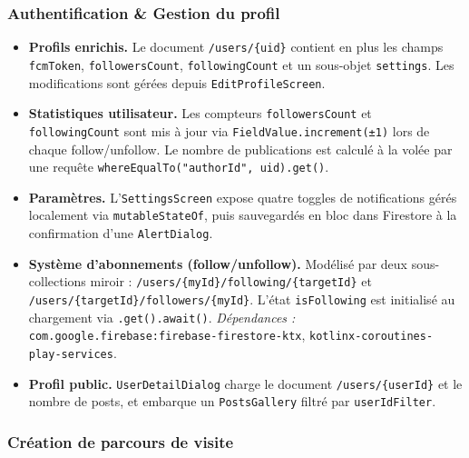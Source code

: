 \documentclass[a4paper, 12pt]{article}
\begin{document}
\begin{justify}
\subsubsection*{Authentification \& Gestion du profil}

\begin{itemize}

    \item \textbf{Profils enrichis.}
    Le document \texttt{/\allowbreak{}users/\allowbreak{}\{uid\}} contient en plus les champs \texttt{fcmToken}, \texttt{followersCount}, \texttt{followingCount} et un sous-objet \texttt{settings}. Les modifications sont gérées depuis \texttt{EditProfileScreen}.

    \item \textbf{Statistiques utilisateur.}
    Les compteurs \texttt{followersCount} et \texttt{followingCount} sont mis à jour via \texttt{FieldValue.\allowbreak{}increment(±1)} lors de chaque follow/unfollow. Le nombre de publications est calculé à la volée par une requête \texttt{whereEqualTo("authorId", uid).\allowbreak{}get()}.

    \item \textbf{Paramètres.}
    L'\texttt{SettingsScreen} expose quatre toggles de notifications gérés localement via \texttt{mutableStateOf}, puis sauvegardés en bloc dans Firestore à la confirmation d'une \texttt{AlertDialog}.

    \item \textbf{Système d'abonnements (follow/unfollow).}
    Modélisé par deux sous-collections miroir : \texttt{/\allowbreak{}users/\allowbreak{}\{myId\}/\allowbreak{}following/\allowbreak{}\{targetId\}} et \texttt{/\allowbreak{}users/\allowbreak{}\{targetId\}/\allowbreak{}followers/\allowbreak{}\{myId\}}. L'état \texttt{isFollowing} est initialisé au chargement via \texttt{.\allowbreak{}get().\allowbreak{}await()}.
    \newline\textit{Dépendances :} \texttt{com.\allowbreak{}google.\allowbreak{}firebase:\allowbreak{}firebase-firestore-ktx}, \texttt{kotlinx-coroutines-play-services}.

    \item \textbf{Profil public.}
    \texttt{UserDetailDialog} charge le document \texttt{/\allowbreak{}users/\allowbreak{}\{userId\}} et le nombre de posts, et embarque un \texttt{PostsGallery} filtré par \texttt{userIdFilter}.

\end{itemize}

\subsubsection*{Création de parcours de visite}


\end{justify}
\end{document}
